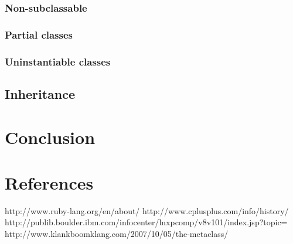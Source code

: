 \documentclass[10pt,a4paper,twocolumn]{article}
\begin{document}
\subsubsection{Non-subclassable}

\subsubsection{Partial classes}

\subsubsection{Uninstantiable classes}

\subsection{Inheritance}

\section{Conclusion}

\section{References}
http://www.ruby-lang.org/en/about/
http://www.cplusplus.com/info/history/
http://publib.boulder.ibm.com/infocenter/lnxpcomp/v8v101/index.jsp?topic=%
http://www.klankboomklang.com/2007/10/05/the-metaclass/
\end{document}

